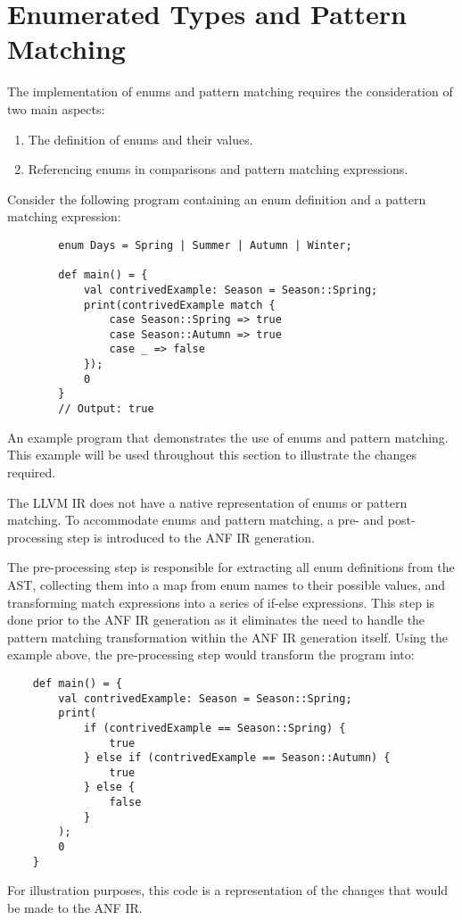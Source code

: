 \section{Enumerated Types and Pattern Matching}

The implementation of enums and pattern matching requires the consideration of two main aspects:
\begin{enumerate}
    \singlespacing
    \item The definition of enums and their values.
    \item Referencing enums in comparisons and pattern matching expressions.
\end{enumerate}
Consider the following program containing an enum definition and a pattern matching expression:

\begin{tcolorbox}
    \begin{verbatim}
        enum Days = Spring | Summer | Autumn | Winter;

        def main() = {
            val contrivedExample: Season = Season::Spring;
            print(contrivedExample match {
                case Season::Spring => true
                case Season::Autumn => true
                case _ => false
            });
            0
        }
        // Output: true
    \end{verbatim}
    \tcblower
    \footnotesize
    An example program that demonstrates the use of enums and pattern matching.
    This example will be used throughout this section to illustrate the changes required.
\end{tcolorbox}

The LLVM IR does not have a native representation of enums or pattern matching. To accommodate enums
and pattern matching, a pre- and post-processing step is introduced to the ANF IR generation.

The pre-processing step is responsible for extracting all enum definitions from the AST, collecting
them into a map from enum names to their possible values, and transforming match expressions into a
series of if-else expressions. This step is done prior to the ANF IR generation as it eliminates the
need to handle the pattern matching transformation within the ANF IR generation itself. Using the
example above, the pre-processing step would transform the program into:

\begin{tcolorbox}
    \begin{verbatim}
    def main() = {
        val contrivedExample: Season = Season::Spring;
        print(
            if (contrivedExample == Season::Spring) {
                true
            } else if (contrivedExample == Season::Autumn) {
                true
            } else {
                false
            }
        );
        0
    }
    \end{verbatim}
    \tcblower
    \footnotesize
    For illustration purposes, this code is a representation of the changes that would be made to
    the ANF IR.
\end{tcolorbox}



